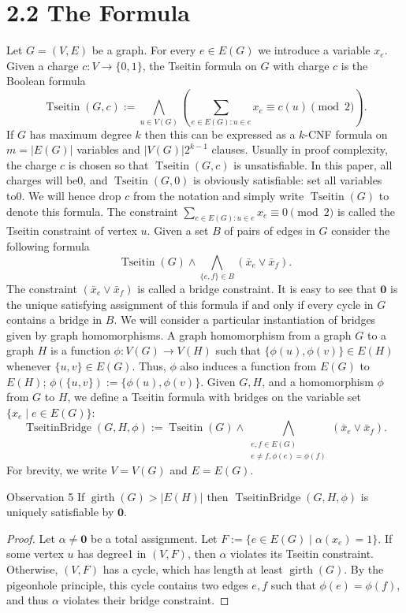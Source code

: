 \section*{2.2 The Formula}
Let $G=(V,E)$ be a graph. For every $e\in E(G)$ we introduce a variable $x_e$. Given a charge $c:V\to\{0,1\}$, the Tseitin formula on $G$ with charge $c$ is the Boolean formula
\begin{equation}
\operatorname{Tseitin}(G,c):=\bigwedge_{u\in V(G)}
\left(\sum_{e\in E(G):u\in e}x_e\equiv c(u)\pmod2\right).\tag{1}
\end{equation}
If $G$ has maximum degree $k$ then this can be expressed as a $k$-CNF formula on $m=|E(G)|$ variables and $|V(G)|2^{k-1}$ clauses. Usually in proof complexity, the charge $c$ is chosen so that $\operatorname{Tseitin}(G,c)$ is unsatisfiable. In this paper, all charges will be0, and $\operatorname{Tseitin}(G,0)$ is obviously satisfiable: set all variables to0. We will hence drop $c$ from the notation and simply write $\operatorname{Tseitin}(G)$ to denote this formula. The constraint $\sum_{e\in E(G):u\in e}x_e\equiv0\pmod2$ is called the Tseitin constraint of vertex $u$. Given a set $B$ of pairs of edges in $G$ consider the following formula
\[
\operatorname{Tseitin}(G)\wedge\bigwedge_{\{e,f\}\in B}(\bar x_e\vee\bar x_f).
\]
The constraint $(\bar x_e\vee\bar x_f)$ is called a bridge constraint. It is easy to see that $\mathbf0$ is the unique satisfying assignment of this formula if and only if every cycle in $G$ contains a bridge in $B$. We will consider a particular instantiation of bridges given by graph homomorphisms. A graph homomorphism from a graph $G$ to a graph $H$ is a function $\phi:V(G)\to V(H)$ such that $\{\phi(u),\phi(v)\}\in E(H)$ whenever $\{u,v\}\in E(G)$. Thus, $\phi$ also induces a function from $E(G)$ to $E(H)$; $\phi(\{u,v\}):=\{\phi(u),\phi(v)\}$. Given $G,H$, and a homomorphism $\phi$ from $G$ to $H$, we define a Tseitin formula with bridges on the variable set $\{x_e\mid e\in E(G)\}$:
\begin{equation}
\operatorname{TseitinBridge}(G,H,\phi):=
\operatorname{Tseitin}(G)\wedge
\bigwedge_{\substack{e,f\in E(G)\\e\ne f,\phi(e)=\phi(f)}}(\bar x_e\vee\bar x_f).\tag{2}
\end{equation}
For brevity, we write $V=V(G)$ and $E=E(G)$.
\begin{authorclaim}{Observation 5}
If $\operatorname{girth}(G)>|E(H)|$ then $\operatorname{TseitinBridge}(G,H,\phi)$ is uniquely satisfiable by $\mathbf0$.
\end{authorclaim}
\begin{proof}
Let $\alpha\ne\mathbf0$ be a total assignment. Let $F:=\{e\in E(G)\mid\alpha(x_e)=1\}$. If some vertex $u$ has degree1 in $(V,F)$, then $\alpha$ violates its Tseitin constraint. Otherwise, $(V,F)$ has a cycle, which has length at least $\operatorname{girth}(G)$. By the pigeonhole principle, this cycle contains two edges $e,f$ such that $\phi(e)=\phi(f)$, and thus $\alpha$ violates their bridge constraint.
\end{proof}

